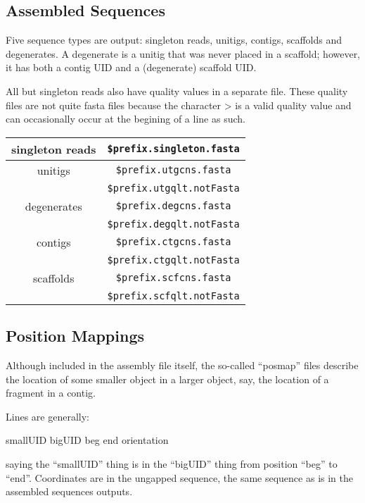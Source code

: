 \documentclass[twoside,11pt]{article}
\begin{document}
\subsection{Assembled Sequences}

Five sequence types are output: singleton reads, unitigs, contigs,
scaffolds and degenerates.  A degenerate is a unitig that was never
placed in a scaffold; however, it has both a contig UID and a
(degenerate) scaffold UID.

All but singleton reads also have quality values in a separate file.
These quality files are not quite fasta files because the character > is a valid
quality value and can occasionally occur at the begining of a line as such.

\begin{center}
\begin{tabular}{|c|c|}
\hline
\hline
singleton reads      & {\tt \$prefix.singleton.fasta} \\
\hline
unitigs              & {\tt \$prefix.utgcns.fasta} \\
                     & {\tt \$prefix.utgqlt.notFasta} \\
\hline
degenerates          & {\tt \$prefix.degcns.fasta} \\
                     & {\tt \$prefix.degqlt.notFasta} \\
\hline
contigs              & {\tt \$prefix.ctgcns.fasta} \\
                     & {\tt \$prefix.ctgqlt.notFasta} \\
\hline
scaffolds            & {\tt \$prefix.scfcns.fasta} \\
                     & {\tt \$prefix.scfqlt.notFasta} \\
\hline
\end{tabular}
\end{center}

\subsection{Position Mappings}

Although included in the assembly file itself, the so-called
``posmap'' files describe the location of some smaller object in a
larger object, say, the location of a fragment in a contig.

Lines are generally:

smallUID bigUID beg end orientation

saying the ``smallUID'' thing is in the ``bigUID'' thing from position
``beg'' to ``end''.  Coordinates are in the ungapped sequence, the
same sequence as is in the assembled sequences outputs.
\end{document}
